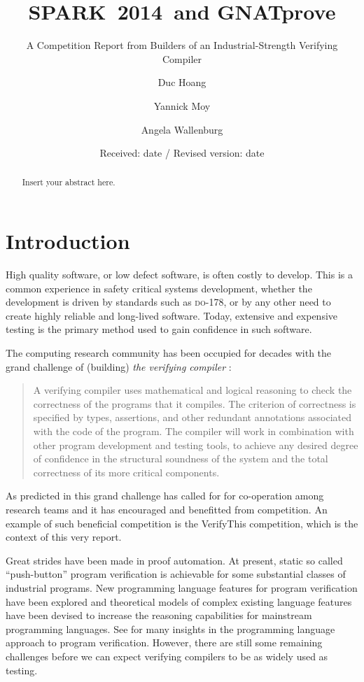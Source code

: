 \documentclass[sttt,draft]{svjour}
\newcommand{\DO}{\textsc{do-178}}
\newcommand{\gnatprove}{GNATprove\xspace}
\newcommand{\newspark}{SPARK~2014\xspace}
\begin{document}
%
\title{\newspark\ and \gnatprove}
\subtitle{A Competition Report from Builders of an Industrial-Strength Verifying Compiler}
\author{Duc Hoang \and Yannick Moy \and Angela Wallenburg
}                     %

\date{Received: date / Revised version: date}
%
\maketitle
%
\begin{abstract}
Insert your abstract here.
\end{abstract}
%
\section{Introduction}
\label{intro}
High quality software, or low defect software, is often costly to
develop. This is a common experience in safety critical systems
development, whether the development is driven by standards such as
\DO, or by any other need to create highly reliable and long-lived
software. Today, extensive and expensive testing is the primary method
used to gain confidence in such software.

The computing research community has been occupied for decades with
the grand challenge of (building) \emph{the verifying compiler}
\cite{Hoare03theverifying}:
%
\begin{quote} A verifying compiler uses mathematical and logical reasoning
  to check the correctness of the programs that it compiles. The
  criterion of correctness is specified by types, assertions, and
  other redundant annotations associated with the code of the
  program. The compiler will work in combination with other program
  development and testing tools, to achieve any desired degree of
  confidence in the structural soundness of the system and the total
  correctness of its more critical components.
\end{quote}

As predicted in \cite{Hoare03theverifying} this grand challenge has
called for for co-operation among research teams and it has encouraged
and benefitted from competition. An example of such beneficial
competition is the VerifyThis competition, which is the context of
this very report.

Great strides have been made in proof automation. At present, static
so called ``push-button'' program verification is achievable for some
substantial classes of industrial programs. New programming language
features for program verification have been explored and theoretical
models of complex existing language features have been devised to
increase the reasoning capabilities for mainstream programming
languages. See \cite{HatcliffLLMP12} for many insights in the
programming language approach to program verification. However, there
are still some remaining challenges before we can expect verifying
compilers to be as widely used as testing.
\end{document}

